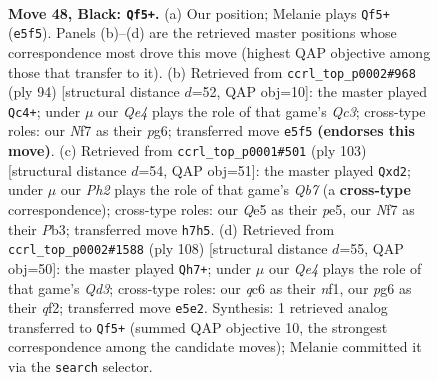 \documentclass[11pt]{article}
\begin{document}
\clearpage

\begin{figure}[p]\centering
\begin{subfigure}{0.46\textwidth}\centering
\resizebox{\linewidth}{!}{%
\newchessgame
\chessboard[
  setfen={1k6/p1p2npp/1pQ3P1/2p1q3/8/2P5/1P6/1K6 b - - 0 48},
  showmover=false,
  pgfstyle=straightmove, color=movearrow, markmove={e5-f5}
]}
\caption{}
\end{subfigure}\hfill
\begin{subfigure}{0.46\textwidth}\centering
\resizebox{\linewidth}{!}{%
\newchessgame
\chessboard[
  setfen={8/4Pk2/p1pq1ppp/8/1P6/P1Q4P/6P1/6K1 w - - 3 48},
  showmover=false,
  pgfstyle=straightmove, color=movearrow, markmove={c3-c4}
]}
\caption{}
\end{subfigure}
\\[4pt]
\begin{subfigure}{0.46\textwidth}\centering
\resizebox{\linewidth}{!}{%
\newchessgame
\chessboard[
  setfen={6k1/5p1p/4pQp1/4P3/3P4/1p4P1/1q1NBK1P/8 b - - 0 52},
  showmover=false,
  pgfstyle=straightmove, color=movearrow, markmove={b2-d2}
]}
\caption{}
\end{subfigure}\hfill
\begin{subfigure}{0.46\textwidth}\centering
\resizebox{\linewidth}{!}{%
\newchessgame
\chessboard[
  setfen={8/4k3/4p3/8/p5p1/P2Q1PP1/4Pq2/5nNK w - - 31 55},
  showmover=false,
  pgfstyle=straightmove, color=movearrow, markmove={d3-h7}
]}
\caption{}
\end{subfigure}
\caption{\textbf{Move 48, Black: \texttt{Qf5+}.} (a) Our position; Melanie plays \texttt{Qf5+} (\texttt{e5f5}). Panels (b)--(d) are the retrieved master positions whose correspondence most drove this move (highest QAP objective among those that transfer to it). (b) Retrieved from \texttt{ccrl\_top\_p0002\#968} (ply 94) [structural distance $d$=52, QAP obj=10]: the master played \texttt{Qc4+}; under $\mu$ our \emph{Qe4} plays the role of that game's \emph{Qc3}; cross-type roles: our \emph{N}f7 as their \emph{p}g6; transferred move \texttt{e5f5} \textbf{(endorses this move)}. (c) Retrieved from \texttt{ccrl\_top\_p0001\#501} (ply 103) [structural distance $d$=54, QAP obj=51]: the master played \texttt{Qxd2}; under $\mu$ our \emph{Ph2} plays the role of that game's \emph{Qb7} (a \textbf{cross-type} correspondence); cross-type roles: our \emph{Q}e5 as their \emph{p}e5, our \emph{N}f7 as their \emph{P}b3; transferred move \texttt{h7h5}. (d) Retrieved from \texttt{ccrl\_top\_p0002\#1588} (ply 108) [structural distance $d$=55, QAP obj=50]: the master played \texttt{Qh7+}; under $\mu$ our \emph{Qe4} plays the role of that game's \emph{Qd3}; cross-type roles: our \emph{q}c6 as their \emph{n}f1, our \emph{p}g6 as their \emph{q}f2; transferred move \texttt{e5e2}. Synthesis: 1 retrieved analog transferred to \texttt{Qf5+} (summed QAP objective 10, the strongest correspondence among the candidate moves); Melanie committed it via the \texttt{search} selector.}
\label{fig:thought-m95}
\end{figure}
\end{document}

